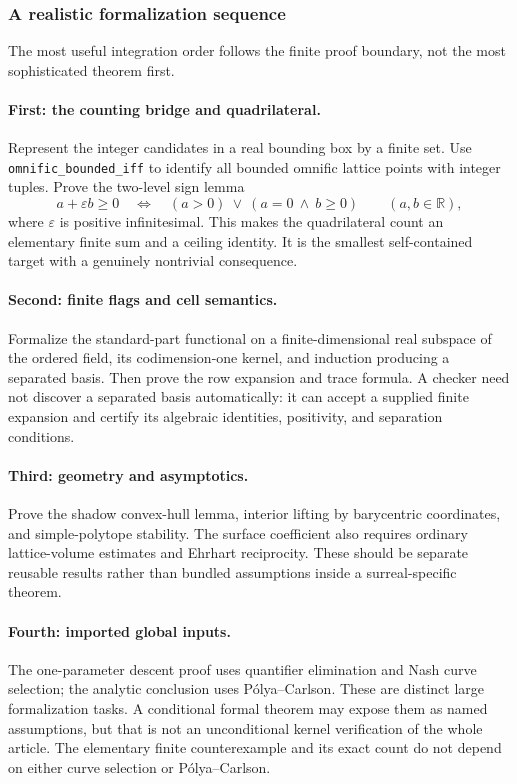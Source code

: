 \documentclass[11pt,a4paper]{article}
\numberwithin{equation}{section}
\theoremstyle{plain}
\newcommand{\R}{\mathbb R}
\newcommand{\eps}{\varepsilon}
\begin{document}
\subsubsection*{A realistic formalization sequence}

The most useful integration order follows the finite proof boundary,
not the most sophisticated theorem first.

\paragraph{First: the counting bridge and quadrilateral.}
Represent the integer candidates in a real bounding box by a finite set.
Use \texttt{omnific\_bounded\_iff} to identify all bounded omnific lattice
points with integer tuples. Prove the two-level sign lemma
\[
 a+\eps b\geq0\quad\Longleftrightarrow\quad
 (a>0)\ \lor\ (a=0\ \land\ b\geq0)
                     \qquad(a,b\in\R),
\]
where $\eps$ is positive infinitesimal. This makes the quadrilateral count
an elementary finite sum and a ceiling identity. It is the smallest
self-contained target with a genuinely nontrivial consequence.

\paragraph{Second: finite flags and cell semantics.}
Formalize the standard-part functional on a finite-dimensional real
subspace of the ordered field, its codimension-one kernel, and induction
producing a separated basis. Then prove the row expansion and trace
formula. A checker need not discover a separated basis automatically: it
can accept a supplied finite expansion and certify its algebraic
identities, positivity, and separation conditions.

\paragraph{Third: geometry and asymptotics.}
Prove the shadow convex-hull lemma, interior lifting by barycentric
coordinates, and simple-polytope stability. The surface coefficient also
requires ordinary lattice-volume estimates and Ehrhart reciprocity. These
should be separate reusable results rather than bundled assumptions inside
a surreal-specific theorem.

\paragraph{Fourth: imported global inputs.}
The one-parameter descent proof uses quantifier elimination and Nash curve
selection; the analytic conclusion uses P\'olya--Carlson. These are distinct
large formalization tasks. A conditional formal theorem may expose them
as named assumptions, but that is not an unconditional kernel verification
of the whole article. The elementary finite counterexample and its exact
count do not depend on either curve selection or P\'olya--Carlson.
\end{document}
